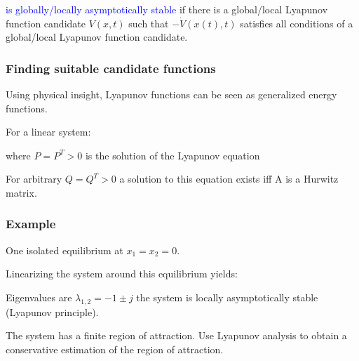 \documentclass[10pt,a4paper]{scrartcl}
\begin{document}
\begin{multicols*}{3}

\textcolor{blue}{is globally/locally asymptotically stable} if there is a global/local Lyapunov function candidate $V(x,t)$ such that $-\dot{V}(x(t),t)$ satisfies all conditions of a global/local Lyapunov function candidate.

\subsubsection{Finding suitable candidate functions}

Using physical insight, Lyapunov functions can be seen as generalized energy functions.

For a linear system:


where $P=P^T>0$ is the solution of the Lyapunov equation


For arbitrary $Q=Q^T>0$ a solution to this equation exists iff A is a Hurwitz matrix.


\subsubsection{Example}


One isolated equilibrium at $x_1=x_2=0$.

Linearizing the system around this equilibrium yields:


Eigenvalues are $\lambda_{1,2}=-1\pm j$ \dahe the system is locally asymptotically stable (Lyapunov principle).

\finn

The system has a finite region of attraction. Use Lyapunov analysis to obtain a conservative estimation of the region of attraction.




\end{multicols*}
\end{document}
